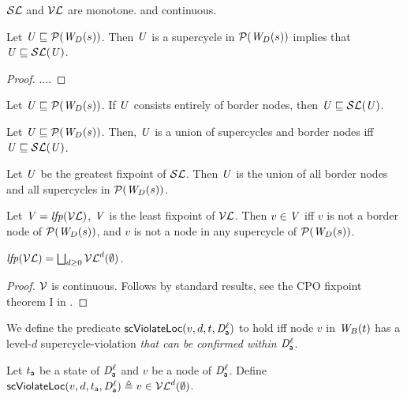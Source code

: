 \bp \label{prop:monotoneL}
$\lSFs$ and $\lVFs$ are monotone. and continuous.
\ep


\bp \label{prop:supercycleLocGFP}
Let $\UU \subg \lwfgS{B}{s}{\DS}$. Then $\UU$ is a supercycle in $\lwfgS{B}{s}{\DS}$ implies that $\UU \subg \lSF{\UU}$.
\ep
%
\begin{proof}
....%
\end{proof}


\bp \label{prop:borderLocGFP}
Let $\UU \subg \lwfgS{B}{s}{\DS}$. If $\UU$ consists entirely of border nodes, then $\UU \subg \lSF{\UU}$.
\ep


\bp \label{prop:locGFP}
Let $\UU \subg \lwfgS{B}{s}{\DS}$. Then, $\UU$ is a union of supercycles and border nodes iff $\UU \subg \lSF{\UU}$.
\ep

\bp \label{prop:GFPisLargestLocSC}
Let $\UU$ be the greatest fixpoint of $\lSFs$. Then $\UU$ is the union of all border nodes and all supercycles in 
$\lwfgS{B}{s}{\DS}$.
\ep

\bp \label{prop:LFPisLocScViolations}
Let  $\VS= \lfp{\lVFs}$, \ie $\VS$ is the least fixpoint of $\lVFs$. Then $v \in \VS$ iff $v$ is not a border node of 
$\lwfgS{B}{s}{\DS}$, and $v$ is not a node in any supercycle of $\lwfgS{B}{s}{\DS}$.
\ep


\bp \label{prop:computeLocLFP}
$\lfp{\lVFs} = \JOIN_{d \ge 0} \lVFs^{d} (\ewfg)$.
\ep
\begin{proof}
$\VFs$ is continuous. Follows by standard results, \eg see the CPO fixpoint theorem I in 
\cite{DP02}.
\end{proof}










We define the predicate $\lviol{v}{d}{t}{\act}{\l}$ to hold iff node $v$ in $\wfg{B}{t}$ has a level-$d$ supercycle-violation
\emph{that can be confirmed within $\dsk{\act}{\l}$}.

\label{def:supercycle.violation.local}
Let $t_\act$ be a state of $\dsk{\act}{\l}$ and $v$ be a node of $\dsk{\act}{\l}$.
Define $\lviol{v}{d}{t_\act}{\act}{\l} \df v \in \lVFs^{d} (\ewfg)$.
\ed




